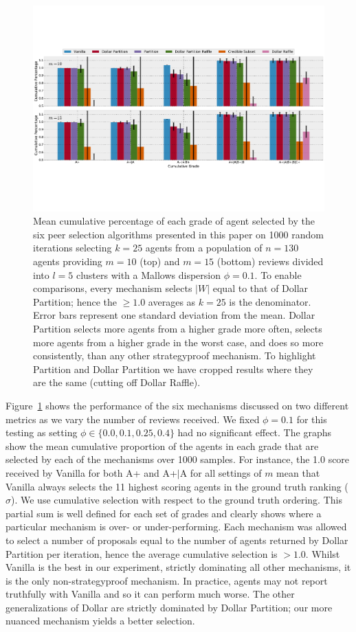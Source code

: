 \documentclass[letterpaper]{article}
\begin{document}
\begin{figure}
\centering
\includegraphics[width=.8\textwidth]{./cumulative_grade_big-emb}
\caption{Mean cumulative percentage of each grade of agent selected by the six peer selection algorithms presented in this paper on 1000 random iterations selecting $k=25$ agents from a population of $n=130$ agents providing $m=10$ (top) and $m=15$ (bottom) reviews divided into $l=5$ clusters with a Mallows dispersion $\phi = 0.1$. To enable comparisons, every mechanism selects $|W|$ equal to that of Dollar Partition; hence the $\geq 1.0$ averages as $k=25$ is the denominator.
Error bars represent one standard deviation from the mean.
Dollar Partition selects more agents from a higher grade more often, selects more agents from a higher grade in the worst case, and does so more consistently, than any other strategyproof mechanism. To highlight Partition and Dollar Partition we have cropped results where they are the same (cutting off Dollar Raffle).}\label{fig:results}
\end{figure}

Figure~\ref{fig:results} shows the performance of the six mechanisms discussed on two different metrics as we vary the number of reviews received. We fixed $\phi=0.1$ for this testing as setting $\phi \in \{0.0, 0.1, 0.25, 0.4\}$ had no significant effect. The graphs show the mean cumulative proportion of the agents in each grade that are selected by each of the mechanisms over 1000 samples. For instance, the 1.0 score received by Vanilla for both A+ and A+$|$A for all settings of $m$ mean that Vanilla always selects the 11 highest scoring agents in the ground truth ranking ($\sigma$). We use cumulative selection with respect to the ground truth ordering.  This partial sum is well defined for each set of grades and clearly shows where a particular mechanism is over- or under-performing. Each mechanism was allowed to select a number of proposals equal to the number of agents returned by Dollar Partition per iteration, hence the average cumulative selection is $>1.0$.
Whilst Vanilla is the best in our experiment, strictly dominating all other mechanisms, it is the only non-strategyproof mechanism. In practice, agents may not report truthfully with Vanilla and so it can perform much worse.
The other generalizations of Dollar are strictly dominated by Dollar Partition; our more nuanced mechanism yields a better selection.
\end{document}
